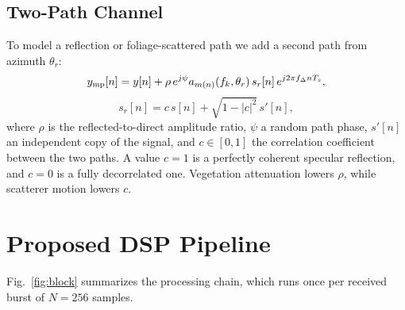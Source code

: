 \documentclass[conference]{IEEEtran}
\begin{document}
\subsection{Two-Path Channel}
To model a reflection or foliage-scattered path we add a second path from azimuth $\theta_r$:
\begin{equation}
y_{\rm mp}[n]=y[n]+\rho\,e^{j\psi}a_{m(n)}(f_k,\theta_r)\,s_r[n]\,e^{j2\pi f_\Delta nT_s},
\label{eq:mp}
\end{equation}
\begin{equation}
s_r[n]=c\,s[n]+\sqrt{1-|c|^2}\,s'[n],
\label{eq:corr}
\end{equation}
where $\rho$ is the reflected-to-direct amplitude ratio, $\psi$ a random path phase, $s'[n]$ an independent copy of the signal, and $c\in[0,1]$ the correlation coefficient between the two paths. A value $c=1$ is a perfectly coherent specular reflection, and $c=0$ is a fully decorrelated one. Vegetation attenuation \cite{itu833} lowers $\rho$, while scatterer motion lowers $c$.

\section{Proposed DSP Pipeline}\label{sec:pipeline}
Fig.~\ref{fig:block} summarizes the processing chain, which runs once per received burst of $N=256$ samples.
\end{document}

